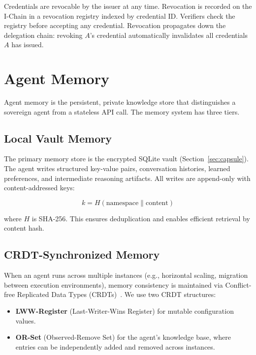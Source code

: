 \documentclass[11pt,a4paper]{article}
\begin{document}
Credentials are revocable by the issuer at any time. Revocation is recorded on the I-Chain in a revocation registry indexed by credential ID. Verifiers check the registry before accepting any credential. Revocation propagates down the delegation chain: revoking $A$'s credential automatically invalidates all credentials $A$ has issued.

\section{Agent Memory}\label{sec:memory}

Agent memory is the persistent, private knowledge store that distinguishes a sovereign agent from a stateless API call. The memory system has three tiers.

\subsection{Local Vault Memory}

The primary memory store is the encrypted SQLite vault (Section~\ref{sec:capsule}). The agent writes structured key-value pairs, conversation histories, learned preferences, and intermediate reasoning artifacts. All writes are append-only with content-addressed keys:

\begin{equation}\label{eq:memory-key}
    k = H(\text{namespace} \| \text{content})
\end{equation}

where $H$ is SHA-256. This ensures deduplication and enables efficient retrieval by content hash.

\subsection{CRDT-Synchronized Memory}

When an agent runs across multiple instances (e.g., horizontal scaling, migration between execution environments), memory consistency is maintained via Conflict-free Replicated Data Types (CRDTs)~\cite{shapiro2011crdts}. We use two CRDT structures:

\begin{itemize}
    \item \textbf{LWW-Register} (Last-Writer-Wins Register) for mutable configuration values.
    \item \textbf{OR-Set} (Observed-Remove Set) for the agent's knowledge base, where entries can be independently added and removed across instances.
\end{itemize}
\end{document}
